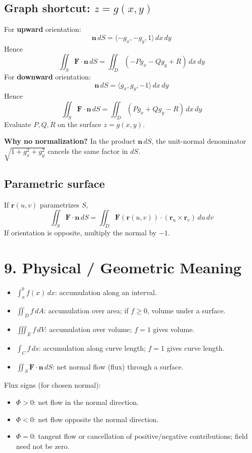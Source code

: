 \documentclass[10pt,a4paper]{article}
\newcommand{\boxeq}[1]{\[\boxed{#1}\]}
\begin{document}
\begin{multicols}{2}
\subsection*{Graph shortcut: $z=g(x,y)$}
For \textbf{upward} orientation:
\boxeq{\mathbf n\,dS=\langle-g_x,-g_y,1\rangle\,dx\,dy}
Hence
\boxeq{\iint_S\mathbf F\cdot\mathbf n\,dS=\iint_D(-Pg_x-Qg_y+R)\,dx\,dy}
For \textbf{downward} orientation:
\boxeq{\mathbf n\,dS=\langle g_x,g_y,-1\rangle\,dx\,dy}
Hence
\boxeq{\iint_S\mathbf F\cdot\mathbf n\,dS=\iint_D(Pg_x+Qg_y-R)\,dx\,dy}
Evaluate $P,Q,R$ on the surface $z=g(x,y)$.

\textbf{Why no normalization?} In the product $\mathbf n\,dS$, the unit-normal denominator $\sqrt{1+g_x^2+g_y^2}$ cancels the same factor in $dS$.

\subsection*{Parametric surface}
If $\mathbf r(u,v)$ parametrizes $S$,
\boxeq{\iint_S\mathbf F\cdot\mathbf n\,dS=\iint_D\mathbf F(\mathbf r(u,v))\cdot(\mathbf r_u\times\mathbf r_v)\,du\,dv}
If orientation is opposite, multiply the normal by $-1$.

\section*{9. Physical / Geometric Meaning}
\begin{itemize}
\item $\int_a^b f(x)\,dx$: accumulation along an interval.
\item $\iint_D f\,dA$: accumulation over area; if $f\ge0$, volume under a surface.
\item $\iiint_E f\,dV$: accumulation over volume; $f=1$ gives volume.
\item $\int_C f\,ds$: accumulation along curve length; $f=1$ gives curve length.
\item $\iint_S \mathbf F\cdot\mathbf n\,dS$: net normal flow (flux) through a surface.
\end{itemize}
Flux signs (for chosen normal):
\begin{itemize}
\item $\Phi>0$: net flow in the normal direction.
\item $\Phi<0$: net flow opposite the normal direction.
\item $\Phi=0$: tangent flow or cancellation of positive/negative contributions; field need not be zero.
\end{itemize}


\end{multicols}
\end{document}
